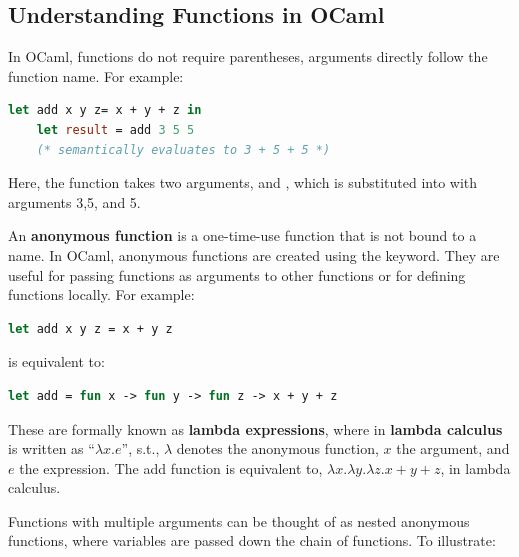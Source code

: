 \subsection{Understanding Functions in OCaml}
In OCaml, functions do not require parentheses, arguments directly follow the function name. 
For example:
\begin{lstlisting}[language=OCaml]
    let add x y z= x + y + z in 
    let result = add 3 5 5
    (* semantically evaluates to 3 + 5 + 5 *)
\end{lstlisting}

\noindent
Here, the  function takes two arguments,  and , which is substituted into  with arguments 3,5, and 5.\\

\begin{Def}

An \textbf{anonymous function} is a one-time-use function that is not bound to a name. In OCaml, anonymous functions are created using the  keyword.
They are useful for passing functions as arguments to other functions or for defining functions locally. For example:

\begin{lstlisting}[language=OCaml, numbers=none]
    let add x y z = x + y z
\end{lstlisting}
\noindent is equivalent to:
\begin{lstlisting}[language=OCaml, numbers=none]
    let add = fun x -> fun y -> fun z -> x + y + z
\end{lstlisting}

\noindent
These are formally known as \textbf{lambda expressions}, where in \textbf{lambda calculus}  is written 
as ``$\lambda x.e$'', s.t., $\lambda$ denotes the anonymous function, $x$ the argument, and $e$ the expression.
The add function is equivalent to, $\lambda x.\lambda y.\lambda z.x + y + z$, in lambda calculus.

\end{Def}

\newpage

\noindent
Functions with multiple arguments can be thought of as nested anonymous functions, where variables are passed 
down the chain of functions. To illustrate:

